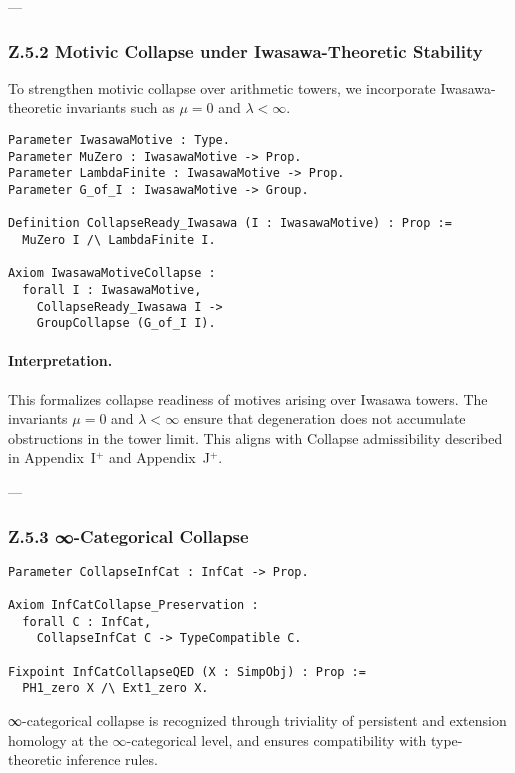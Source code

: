 \documentclass[11pt]{article}
\begin{document}
---

\subsubsection*{Z.5.2 Motivic Collapse under Iwasawa-Theoretic Stability}

To strengthen motivic collapse over arithmetic towers, we incorporate Iwasawa-theoretic invariants such as $\mu = 0$ and $\lambda < \infty$.

\begin{lstlisting}[language=Coq]
Parameter IwasawaMotive : Type.
Parameter MuZero : IwasawaMotive -> Prop.
Parameter LambdaFinite : IwasawaMotive -> Prop.
Parameter G_of_I : IwasawaMotive -> Group.

Definition CollapseReady_Iwasawa (I : IwasawaMotive) : Prop :=
  MuZero I /\ LambdaFinite I.

Axiom IwasawaMotiveCollapse :
  forall I : IwasawaMotive,
    CollapseReady_Iwasawa I ->
    GroupCollapse (G_of_I I).
\end{lstlisting}

\paragraph{Interpretation.}
This formalizes collapse readiness of motives arising over Iwasawa towers. The invariants $\mu = 0$ and $\lambda < \infty$ ensure that degeneration does not accumulate obstructions in the tower limit. This aligns with Collapse admissibility described in Appendix~I$^+$ and Appendix~J$^+$.

---

\subsubsection*{Z.5.3 ∞-Categorical Collapse}

\begin{lstlisting}[language=Coq]
Parameter CollapseInfCat : InfCat -> Prop.

Axiom InfCatCollapse_Preservation :
  forall C : InfCat,
    CollapseInfCat C -> TypeCompatible C.

Fixpoint InfCatCollapseQED (X : SimpObj) : Prop :=
  PH1_zero X /\ Ext1_zero X.
\end{lstlisting}

∞-categorical collapse is recognized through triviality of persistent and extension homology at the $\infty$-categorical level, and ensures compatibility with type-theoretic inference rules.
\end{document}
